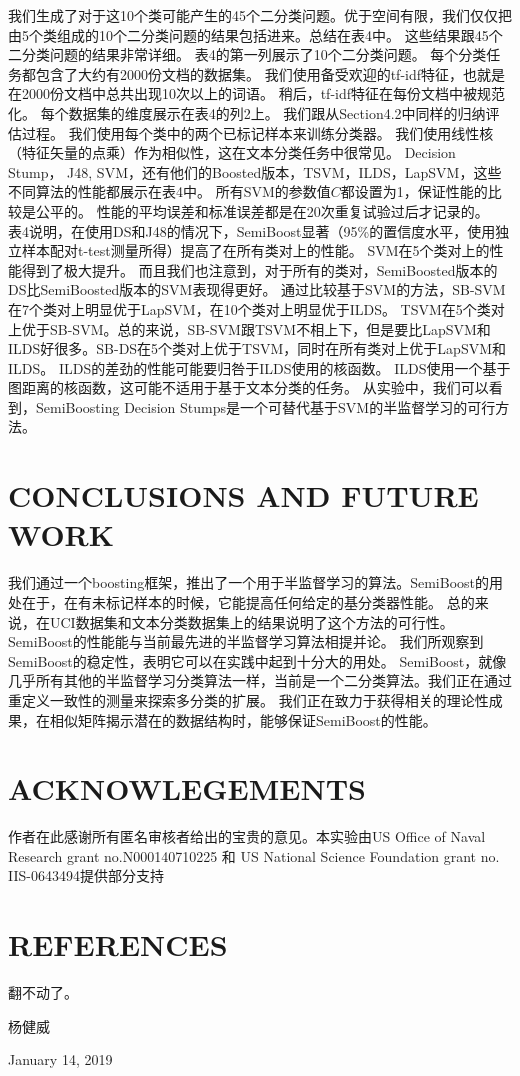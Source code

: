 \documentclass[10pt,journal,compsoc]{IEEEtran}
\begin{document}
我们生成了对于这10个类可能产生的45个二分类问题。优于空间有限，我们仅仅把由5个类组成的10个二分类问题的结果包括进来。总结在表4中。
这些结果跟45个二分类问题的结果非常详细。
表4的第一列展示了10个二分类问题。
每个分类任务都包含了大约有2000份文档的数据集。
我们使用备受欢迎的tf-idf特征，也就是在2000份文档中总共出现10次以上的词语。
稍后，tf-idf特征在每份文档中被规范化。
每个数据集的维度展示在表4的列2上。
我们跟从Section4.2中同样的归纳评估过程。
我们使用每个类中的两个已标记样本来训练分类器。
我们使用线性核（特征矢量的点乘）作为相似性，这在文本分类任务中很常见。
Decision Stump， J48, SVM，还有他们的Boosted版本，TSVM，ILDS，LapSVM，这些不同算法的性能都展示在表4中。
所有SVM的参数值$C$都设置为1，保证性能的比较是公平的。
性能的平均误差和标准误差都是在20次重复试验过后才记录的。\\

表4说明，在使用DS和J48的情况下，SemiBoost显著（95\%的置信度水平，使用独立样本配对t-test测量所得）提高了在所有类对上的性能。
SVM在5个类对上的性能得到了极大提升。
而且我们也注意到，对于所有的类对，SemiBoosted版本的DS比SemiBoosted版本的SVM表现得更好。
通过比较基于SVM的方法，SB-SVM在7个类对上明显优于LapSVM，在10个类对上明显优于ILDS。
TSVM在5个类对上优于SB-SVM。总的来说，SB-SVM跟TSVM不相上下，但是要比LapSVM和ILDS好很多。SB-DS在5个类对上优于TSVM，同时在所有类对上优于LapSVM和ILDS。
ILDS的差劲的性能可能要归咎于ILDS使用的核函数。
ILDS使用一个基于图距离的核函数，这可能不适用于基于文本分类的任务。
从实验中，我们可以看到，SemiBoosting Decision Stumps是一个可替代基于SVM的半监督学习的可行方法。

\section{CONCLUSIONS AND FUTURE WORK}
我们通过一个boosting框架，推出了一个用于半监督学习的算法。SemiBoost的用处在于，在有未标记样本的时候，它能提高任何给定的基分类器性能。
总的来说，在UCI数据集和文本分类数据集上的结果说明了这个方法的可行性。
SemiBoost的性能能与当前最先进的半监督学习算法相提并论。
我们所观察到SemiBoost的稳定性，表明它可以在实践中起到十分大的用处。
SemiBoost，就像几乎所有其他的半监督学习分类算法一样，当前是一个二分类算法。我们正在通过重定义一致性的测量来探索多分类的扩展。
我们正在致力于获得相关的理论性成果，在相似矩阵揭示潜在的数据结构时，能够保证SemiBoost的性能。

\section{ACKNOWLEGEMENTS}
作者在此感谢所有匿名审核者给出的宝贵的意见。本实验由US Office of Naval Research grant no.N000140710225 和 US National Science Foundation grant no. IIS-0643494提供部分支持

\section{REFERENCES}
翻不动了。

\hfill 杨健威
 
\hfill January 14, 2019
\end{document}
